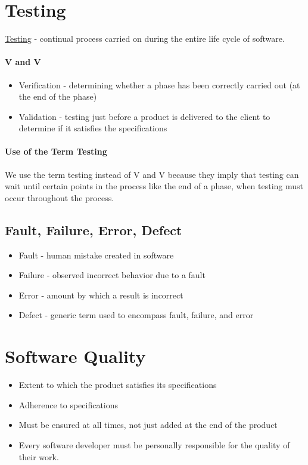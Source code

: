 \documentclass{report}
\begin{document}
		\section{Testing}
			\underline{Testing} - continual process carried on during the entire life cycle of software.\\
			\paragraph{V and V}
				\begin{itemize}
					\item Verification - determining whether a phase has been correctly carried out (at the end of the phase) 
					\item Validation - testing just before a product is delivered to the client to determine if it satisfies the specifications
				\end{itemize}
			\paragraph{Use of the Term Testing}
				We use the term testing instead of V and V because they imply that testing can wait until certain points in the process like the end of a phase, when testing must occur throughout the process.
			\subsection{Fault, Failure, Error, Defect}
				\begin{itemize}
					\item Fault - human mistake created in software
					\item Failure - observed incorrect behavior due to a fault
					\item Error - amount by which a result is incorrect 
					\item Defect - generic term used to encompass fault, failure, and error
				\end{itemize}
		\section{Software Quality}
			\begin{itemize}
				\item Extent to which the product satisfies its specifications
				\item Adherence to specifications
				\item Must be ensured at all times, not just added at the end of the product
				\item Every software developer must be personally responsible for the quality of their work.
			\end{itemize}
\end{document}
